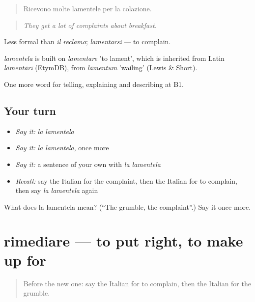 \begin{quote}
Ricevono molte lamentele per la colazione.
\end{quote}

\begin{quote}
\emph{They get a lot of complaints about breakfast.}
\end{quote}

Less formal than \emph{il reclamo}; \emph{lamentarsi} — to complain.

\begin{cousinweb}
\emph{lamentela} is built on \emph{lamentare} 'to lament', which is inherited from Latin \emph{lāmentārī} (EtymDB), from \emph{lāmentum} 'wailing' (Lewis \& Short).
\end{cousinweb}

\begin{grammarlens}[title={What you've built}]
One more word for telling, explaining and describing at B1.
\end{grammarlens}

\subsection*{Your turn}
\begin{itemize}
\raggedright
  \item \emph{Say it:} \emph{la lamentela}
  \item \emph{Say it:} \emph{la lamentela}, once more
  \item \emph{Say it:} a sentence of your own with \emph{la lamentela}
  \item \emph{Recall:} say the Italian for the complaint, then the Italian for to complain, then say \emph{la lamentela} again
\end{itemize}

\begin{tcolorbox}[breakable,colback=teal!4,colframe=teal!35!black,title={Before you move on}]
What does la lamentela mean? (\textquotedblleft{}The grumble, the complaint\textquotedblright{}.) Say it once more.
\end{tcolorbox}
\section[rimediare]{rimediare — to put right, to make up for}

\label{lesson:IT-C438-rimediare}



\begin{quote}
Before the new one: say the Italian for to complain, then the Italian for the grumble.
\end{quote}

